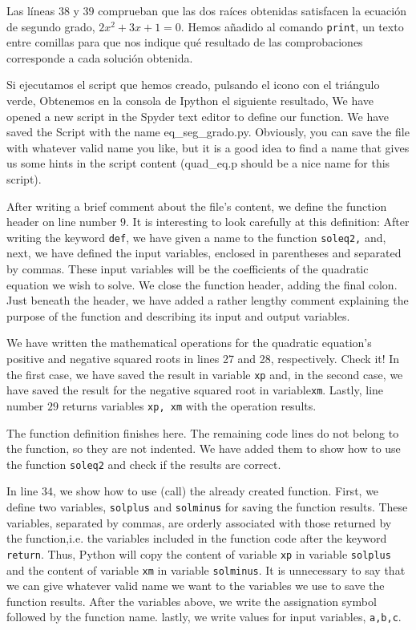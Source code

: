 \begin{paracol}{2}
     Las líneas $38$ y $39$ comprueban que las dos raíces obtenidas satisfacen la ecuación de segundo grado, $2x^2+3x+1 = 0$. Hemos añadido al comando \texttt{print}, un texto entre comillas para que nos indique qué resultado de las comprobaciones corresponde a cada solución obtenida.

     Si ejecutamos el script que hemos creado, pulsando el icono con el triángulo verde, Obtenemos en la consola de Ipython el siguiente resultado,
     \switchcolumn
     We have opened a new script in the Spyder text editor to define our function. We have saved the Script with the name {eq\_seg\_grado.py}. Obviously, you can save the file with whatever valid name you like, but it is a good idea to find a name that gives us some hints in the script content (quad\_eq.p should be a nice name for this script). 

     After writing a brief comment about the file's content, we define the function header on line number $9$. It is interesting to look carefully at this definition: After writing the keyword \texttt{def}, we have given a name to the function \texttt{soleq2,} and, next, we have defined the input variables, enclosed in parentheses and separated by commas. These input variables will be the coefficients of the quadratic equation we wish to solve. We close the function header, adding the final colon. Just beneath the header, we have added a rather lengthy comment explaining the purpose of the function and describing its input and output variables.

     We have written the mathematical operations for the quadratic equation's positive and negative squared roots in lines 27 and 28, respectively. Check it! In the first case, we have saved the result in variable \texttt{xp} and, in the second case, we have saved the result for the negative squared root in variable\texttt{xm}. Lastly, line number $29$ returns variables \texttt{xp, xm} with the operation results.

     The function definition finishes here. The remaining code lines do not belong to the function, so they are not indented. We have added them to show how to use the function \texttt{soleq2} and check if the results are correct.

     In line $34$, we show how to use (call) the already created function. First, we define two variables, \texttt{solplus} and \texttt{solminus} for saving the function results.
     These variables, separated by commas, are orderly associated with those returned by the function,i.e. the variables included in the function code after the keyword \texttt{return}. Thus, Python will copy the content of variable \texttt{xp} in variable \texttt{solplus} and the content of variable \texttt{xm} in variable \texttt{solminus}. It is unnecessary to say that we can give whatever valid name we want to the variables we use to save the function results. After the variables above, we write the assignation symbol followed by the function name. lastly, we write values for input variables, \texttt{a,b,c}.


\end{paracol}
